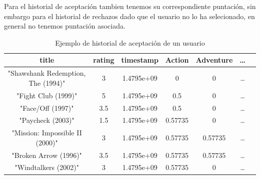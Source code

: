 \begin{obs}
    Para el historial de aceptación tambien tenemos su correspondiente puntación, sin embargo para el historial de rechazos dado que el usuario no lo ha selecionado, en general no tenemos puntación asociada.
\end{obs}
\begin{table}
\begin{center}
    \begin{tabular}{|c|c|c|c|c|c|c|}
        \hline
        \textbf{title}          &              \textbf{rating}  &  \textbf{timestamp}   &    \textbf{Action}   &  \textbf{Adventure} & \dots \\
        \hline
"Shawshank Redemption, The (1994)"    &     3    &  1.4795e+09      &  0    &    0 & \dots\\
"Fight Club (1999)"                   &     5    &  1.4795e+09      &  0.5  &    0 & \dots\\
"Face/Off (1997)"                     &   3.5    &  1.4795e+09      &  0.5  &    0 & \dots\\
"Paycheck (2003)"                     &   1.5    &  1.4795e+09      &  0.57735  &         0 & \dots\\
"Mission: Impossible II (2000)"       &    3     &  1.4795e+09      &  0.57735  &   0.57735 & \dots\\
"Broken Arrow (1996)"                 &   3.5    &  1.4795e+09      &  0.57735  &   0.57735 & \dots\\
"Windtalkers (2002)"                  &     3    &  1.4795e+09      &  0.57735  &         0 & \dots\\
\hline
    \end{tabular}
\end{center}
\caption{Ejemplo de historial de aceptación de un usuario}\label{cuadroacp}


\end{table}
